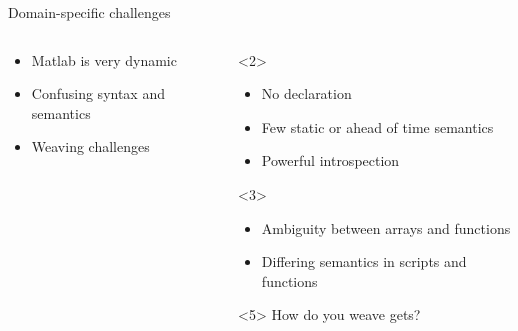 \begin{frame}{Domain-specific challenges}
  \begin{columns}
    \begin{column}{5cm}
      \begin{itemize}
      \item<alert@2> Matlab is very dynamic
      \item<alert@3> Confusing syntax and semantics
      \item<alert@4-> Weaving challenges
      \end{itemize}
    \end{column}
    \begin{column}{5cm}
      \begin{onlyenv}<2>
          \begin{itemize}
          \item No declaration 
          \item Few static or ahead of time semantics
          \item Powerful introspection
          \end{itemize}
      \end{onlyenv}
      \begin{onlyenv}<3>
          \begin{itemize}
          \item Ambiguity between arrays and functions
          \item Differing semantics in scripts and functions 
          \end{itemize}
      \end{onlyenv}
      \begin{onlyenv}<5>
          How do you weave gets?
      \end{onlyenv}
    \end{column}
  \end{columns}
\end{frame}

